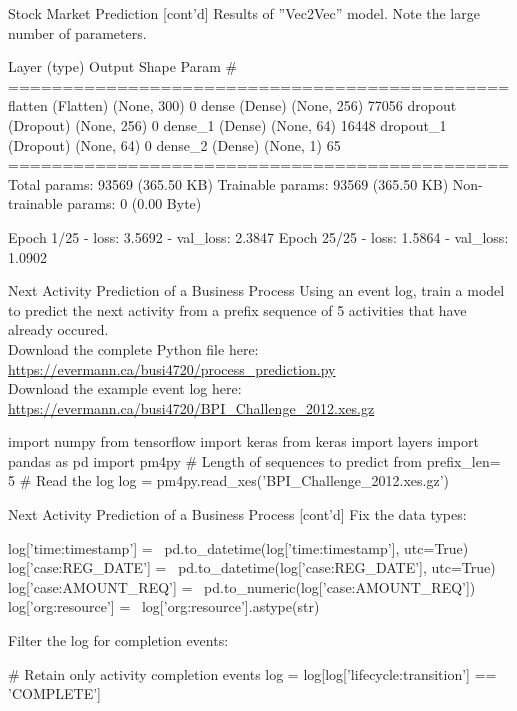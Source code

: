\documentclass[ignorenonframetext,xcolor=x11names]{beamer}
\begin{document}
\begin{frame}[label=withcode,fragile]{Stock Market Prediction \small [cont'd]}
Results of ''Vec2Vec'' model. Note the large number of parameters.

\begin{textcode}
 Layer (type)          Output Shape    Param #   
==============================================
 flatten (Flatten)     (None, 300)     0         
 dense (Dense)         (None, 256)     77056     
 dropout (Dropout)     (None, 256)     0         
 dense_1 (Dense)       (None, 64)      16448     
 dropout_1 (Dropout)   (None, 64)      0         
 dense_2 (Dense)       (None, 1)       65        
==============================================
Total params: 93569 (365.50 KB)
Trainable params: 93569 (365.50 KB)
Non-trainable params: 0 (0.00 Byte)

Epoch 1/25  - loss: 3.5692 - val_loss: 2.3847
Epoch 25/25 - loss: 1.5864 - val_loss: 1.0902
\end{textcode}
\end{frame}

\begin{frame}[label=withcode,fragile]{Next Activity Prediction of a Business Process}
\small
Using an event log, train a model to predict the next activity from a prefix sequence of 5 activities that have already occured. \\

Download the complete Python file here: \url{https://evermann.ca/busi4720/process_prediction.py} \\

Download the example event log here: \url{https://evermann.ca/busi4720/BPI_Challenge_2012.xes.gz}

\begin{pythoncode}
import numpy
from tensorflow import keras
from keras import layers
import pandas as pd
import pm4py
# Length of sequences to predict from
prefix_len= 5
# Read the log
log = pm4py.read_xes('BPI_Challenge_2012.xes.gz')
\end{pythoncode}
\end{frame}

\begin{frame}[label=withcode,fragile]{Next Activity Prediction of a Business Process \small [cont'd]}
Fix the data types:
\begin{pythoncode}
log['time:timestamp'] = \
    pd.to_datetime(log['time:timestamp'], utc=True)
log['case:REG_DATE'] = \
    pd.to_datetime(log['case:REG_DATE'], utc=True)
log['case:AMOUNT_REQ'] = \
    pd.to_numeric(log['case:AMOUNT_REQ'])
log['org:resource'] = \
    log['org:resource'].astype(str)
\end{pythoncode}
Filter the log for completion events:
\begin{pythoncode}
# Retain only activity completion events
log = log[log['lifecycle:transition'] == 'COMPLETE']
\end{pythoncode}
\end{frame}
\end{document}
